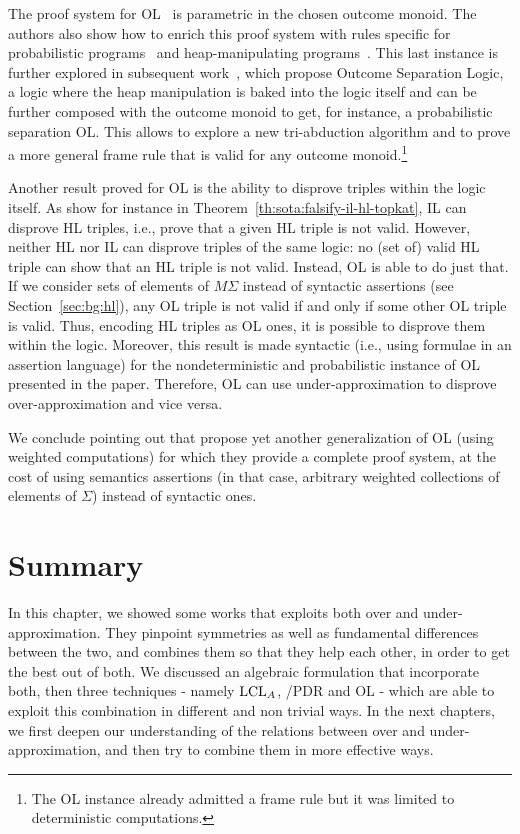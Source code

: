 The proof system for OL~\cite[Figure~4]{ZDS23} is parametric in the chosen outcome monoid. The authors also show how to enrich this proof system with rules specific for probabilistic programs~\cite[Figure~7]{ZDS23} and heap-manipulating programs~\cite[Figure~6]{ZDS23}. This last instance is further explored in subsequent work~\cite{ZSS24}, which propose Outcome Separation Logic, a logic where the heap manipulation is baked into the logic itself and can be further composed with the outcome monoid to get, for instance, a probabilistic separation OL. This allows to explore a new tri-abduction algorithm and to prove a more general frame rule that is valid for any outcome monoid.\footnote{The OL instance already admitted a frame rule but it was limited to deterministic computations.}

Another result proved for OL is the ability to disprove triples within the logic itself. As show for instance in Theorem~\ref{th:sota:falsify-il-hl-topkat}, IL can disprove HL triples, i.e., prove that a given HL triple is not valid. However, neither HL nor IL can disprove triples of the same logic: no (set of) valid HL triple can show that an HL triple is not valid. Instead, OL is able to do just that. If we consider sets of elements of $M \Sigma$ instead of syntactic assertions (see Section~\ref{sec:bg:hl}), any OL triple is not valid if and only if some other OL triple is valid. Thus, encoding HL triples as OL ones, it is possible to disprove them within the logic. Moreover, this result is made syntactic (i.e., using formulae in an assertion language) for the nondeterministic and probabilistic instance of OL presented in the paper. Therefore, OL can use under-approximation to disprove over-approximation and vice versa.

We conclude pointing out that \cite{Zilberstein24} propose yet another generalization of OL (using weighted computations) for which they provide a complete proof system, at the cost of using semantics assertions (in that case, arbitrary weighted collections of elements of $\Sigma$) instead of syntactic ones.

\section{Summary}
In this chapter, we showed some works that exploits both over and under-approximation. They pinpoint symmetries as well as fundamental differences between the two, and combines them so that they help each other, in order to get the best out of both. We discussed an algebraic formulation that incorporate both, then three techniques - namely $\text{LCL}_A$, /PDR and OL - which are able to exploit this combination in different and non trivial ways. In the next chapters, we first deepen our understanding of the relations between over and under-approximation, and then try to combine them in more effective ways.
